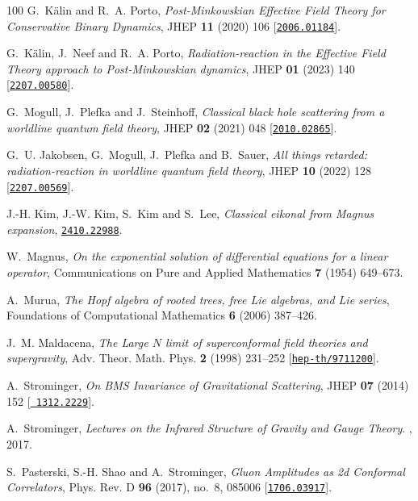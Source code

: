 \begin{thebibliography}{100}
G.~K\"alin and R.~A. Porto,  {\em {Post-Minkowskian Effective Field Theory for
  Conservative Binary Dynamics}}, JHEP {\bf 11} (2020) 106
  [\href{http://www.arXiv.org/abs/2006.01184}{{\tt 2006.01184}}].

G.~K\"alin, J.~Neef and R.~A. Porto,  {\em {Radiation-reaction in the Effective
  Field Theory approach to Post-Minkowskian dynamics}}, JHEP {\bf 01} (2023)
  140 [\href{http://www.arXiv.org/abs/2207.00580}{{\tt 2207.00580}}].

G.~Mogull, J.~Plefka and J.~Steinhoff,  {\em {Classical black hole scattering
  from a worldline quantum field theory}}, JHEP {\bf 02} (2021) 048
  [\href{http://www.arXiv.org/abs/2010.02865}{{\tt 2010.02865}}].

G.~U. Jakobsen, G.~Mogull, J.~Plefka and B.~Sauer,  {\em {All things retarded:
  radiation-reaction in worldline quantum field theory}}, JHEP {\bf 10} (2022)
  128 [\href{http://www.arXiv.org/abs/2207.00569}{{\tt 2207.00569}}].

J.-H. Kim, J.-W. Kim, S.~Kim and S.~Lee,  {\em {Classical eikonal from Magnus
  expansion}}, \href{http://www.arXiv.org/abs/2410.22988}{{\tt 2410.22988}}.

W.~Magnus,  {\em {On the exponential solution of differential equations for a
  linear operator}}, Communications on Pure and Applied Mathematics {\bf 7}
  (1954) 649--673.

A.~Murua,  {\em {The Hopf algebra of rooted trees, free Lie algebras, and Lie
  series}}, Foundations of Computational Mathematics {\bf 6} (2006) 387--426.

J.~M. Maldacena,  {\em {The Large $N$ limit of superconformal field theories
  and supergravity}}, Adv. Theor. Math. Phys. {\bf 2} (1998) 231--252
  [\href{http://www.arXiv.org/abs/hep-th/9711200}{{\tt hep-th/9711200}}].

A.~Strominger,  {\em {On BMS Invariance of Gravitational Scattering}}, JHEP
  {\bf 07} (2014) 152 [\href{http://www.arXiv.org/abs/1312.2229}{{\tt
  1312.2229}}].

A.~Strominger, {\em {Lectures on the Infrared Structure of Gravity and Gauge
  Theory}}.
, 2017.

S.~Pasterski, S.-H. Shao and A.~Strominger,  {\em {Gluon Amplitudes as 2d
  Conformal Correlators}}, Phys. Rev. D {\bf 96} (2017), no.~8, 085006
  [\href{http://www.arXiv.org/abs/1706.03917}{{\tt 1706.03917}}].


\end{thebibliography}
